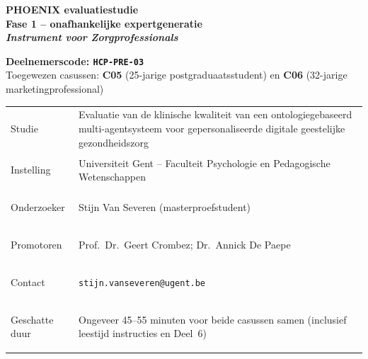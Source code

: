 \documentclass[11pt,a4paper]{article}
\renewcommand{\arraystretch}{1.28}
\begin{document}
\thispagestyle{fancy}
\vspace*{0.3cm}

\begin{tcolorbox}[
  colback=DarkBlue,colframe=DarkBlue,
  arc=3mm,left=14pt,right=14pt,top=12pt,bottom=12pt,
  width=\textwidth
]
\centering
{\fontsize{22}{28}\selectfont\bfseries\color{white}
PHOENIX evaluatiestudie\\[0.3em]
\fontsize{15}{20}\selectfont\color{AccentBlue}
Fase 1 -- onafhankelijke expertgeneratie\\[0.2em]
\fontsize{12}{16}\selectfont\color{white}
\textit{Instrument voor Zorgprofessionals}
}
\end{tcolorbox}

\vspace{0.6cm}

\begin{center}
\begin{tcolorbox}[
  colback=AccentBlue,colframe=PrimaryBlue,
  arc=2.5mm,boxrule=1.2pt,left=12pt,right=12pt,top=10pt,bottom=10pt,
  width=0.86\textwidth
]
\centering
{\large\bfseries\color{DarkBlue}Deelnemerscode: \texttt{HCP-PRE-03}}\\[0.5em]
{\normalsize\color{SlateMid}
Toegewezen casussen:\quad
\textbf{\color{PrimaryBlue}C05} (25-jarige postgraduaatsstudent)
\quad en \quad
\textbf{\color{PrimaryBlue}C06} (32-jarige marketingprofessional)
}
\end{tcolorbox}
\end{center}

\vspace{0.5cm}

\begin{center}
\begin{tcolorbox}[
  colback=SoftBG,colframe=BorderGrey,
  arc=2mm,left=10pt,right=10pt,top=9pt,bottom=9pt,
  width=0.92\textwidth
]
\small\renewcommand{\arraystretch}{1.28}
\begin{tabularx}{\textwidth}{@{}>{\bfseries\raggedright\arraybackslash}p{}X@{}}
Studie & Evaluatie van de klinische kwaliteit van een ontologiegebaseerd multi-agentsysteem voor gepersonaliseerde digitale geestelijke gezondheidszorg \\
Instelling & Universiteit Gent -- Faculteit Psychologie en Pedagogische Wetenschappen \\
Onderzoeker & Stijn Van Severen (masterproefstudent) \\
Promotoren & Prof.\ Dr.\ Geert Crombez; Dr.\ Annick De Paepe \\
Contact & \texttt{stijn.vanseveren@ugent.be} \\
Geschatte duur & Ongeveer 45--55 minuten voor beide casussen samen (inclusief leestijd instructies en Deel~6) \\
\end{tabularx}
\end{tcolorbox}
\end{center}
\end{document}
